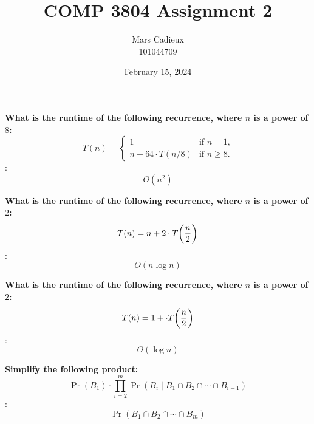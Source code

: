 \documentclass[12pt]{article}
\title{COMP 3804 Assignment 2}
\author{Mars Cadieux \\ 101044709}
\date{February 15, 2024}
\newcommand{\definition}[2]{\textbf{#1}: #2}
\begin{document}
{\selectfont

\maketitle

\newpage

\definition{What is the runtime of the following recurrence, where $n$ is a power of $8$: \[ T(n) = \left\{ \begin{array}{ll} 1 & \mbox{if $n=1$,} \\  n + 64 \cdot T(n/8) & \mbox{if $n \geq 8$.}  \end{array} \right. \]}{$$O(n^2)$$}

\definition{What is the runtime of the following recurrence, where $n$ is a power of $2$: $$T(n) = n + 2 \cdot T \bigg{(}\frac{n}{2}\bigg{)}$$}{$$O(n\log n)$$}

\definition{What is the runtime of the following recurrence, where $n$ is a power of $2$: $$T(n) = 1 + \cdot T \bigg{(}\frac{n}{2}\bigg{)}$$}{$$O(\log n)$$}

\definition{Simplify the following product: $$\Pr \left( B_1 \right) \cdot \prod_{i=2}^{m} \Pr \left( B_i \mid B_1 \cap B_2 \cap \cdots \cap B_{i-1} \right) $$}{$$\Pr \left( B_1 \cap B_2 \cap \cdots \cap B_m \right) $$}



}
\end{document}
